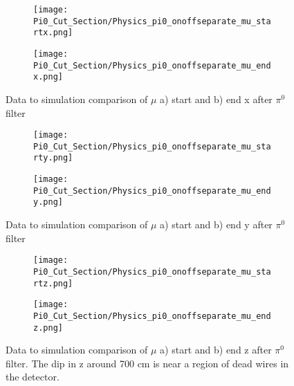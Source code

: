 \begin{figure}[H]
\centering
  \begin{subfigure}[t]{0.3\textwidth}
    \centering
\texttt{[image: Pi0\_Cut\_Section/Physics\_pi0\_onoffseparate\_mu\_startx.png]}
  \caption{ }
  \end{subfigure} 
  \hspace{30mm}
  \begin{subfigure}[t]{0.3\textwidth}
    \centering
\texttt{[image: Pi0\_Cut\_Section/Physics\_pi0\_onoffseparate\_mu\_endx.png]}
  \caption{ }
  \end{subfigure} 
\caption{ Data to simulation comparison of $\mu$ a) start and b) end x after $\pi^0$ filter }
\label{fig:physics_pi0_mu_x}
\end{figure}

\begin{figure}[H]
\centering
  \begin{subfigure}[t]{0.3\textwidth}
    \centering
\texttt{[image: Pi0\_Cut\_Section/Physics\_pi0\_onoffseparate\_mu\_starty.png]}
  \caption{ }
  \end{subfigure} 
  \hspace{30mm}
  \begin{subfigure}[t]{0.3\textwidth}
    \centering
\texttt{[image: Pi0\_Cut\_Section/Physics\_pi0\_onoffseparate\_mu\_endy.png]}
  \caption{ }
  \end{subfigure} 
\caption{ Data to simulation comparison of $\mu$ a) start and b) end y after $\pi^0$ filter }
\label{fig:physics_pi0_mu_y}
\end{figure}

\begin{figure}[H]
\centering
  \begin{subfigure}[t]{0.3\textwidth}
    \centering
\texttt{[image: Pi0\_Cut\_Section/Physics\_pi0\_onoffseparate\_mu\_startz.png]}
  \caption{ }
  \end{subfigure} 
  \hspace{30mm}
  \begin{subfigure}[t]{0.3\textwidth}
    \centering
\texttt{[image: Pi0\_Cut\_Section/Physics\_pi0\_onoffseparate\_mu\_endz.png]}
  \caption{ }
  \end{subfigure} 
\caption{ Data to simulation comparison of $\mu$ a) start and b) end z after $\pi^0$ filter.  The dip in z around 700 cm is near a region of dead wires in the detector. }
\label{fig:physics_pi0_mu_z}
\end{figure}

